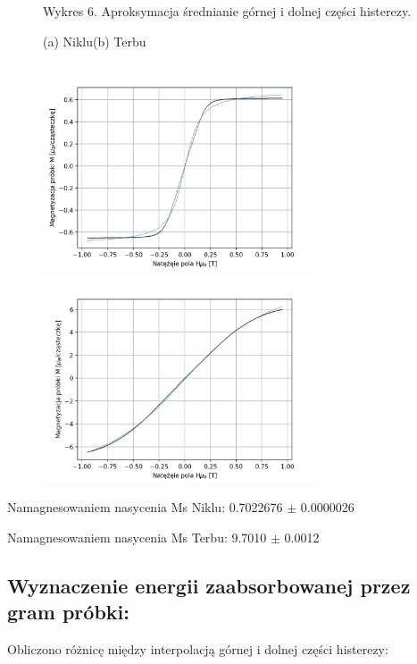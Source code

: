 \documentclass[a4paper]{article}
\begin{document}
\begin{figure}[H]
    \centering
    Wykres 6. Aproksymacja średnianie górnej i dolnej części histerezy.
    \vspace{0.6cm}
    
    (a) Niklu\hspace{7cm}(b) Terbu
    
    \includegraphics[width=8.2cm]{Ni_aprox.png}
    \includegraphics[width=8.2cm]{Tb_aprox.png}
    \label{fig:my_label}
\end{figure}

Namagnesowaniem nasycenia Ms Niklu:  0.7022676 $\pm$ 0.0000026

Namagnesowaniem nasycenia Ms Terbu:  9.7010 $\pm$ 0.0012

\newpage
\subsection{Wyznaczenie energii zaabsorbowanej przez gram próbki:}



Obliczono różnicę między interpolacją górnej i dolnej części histerezy:
\end{document}
